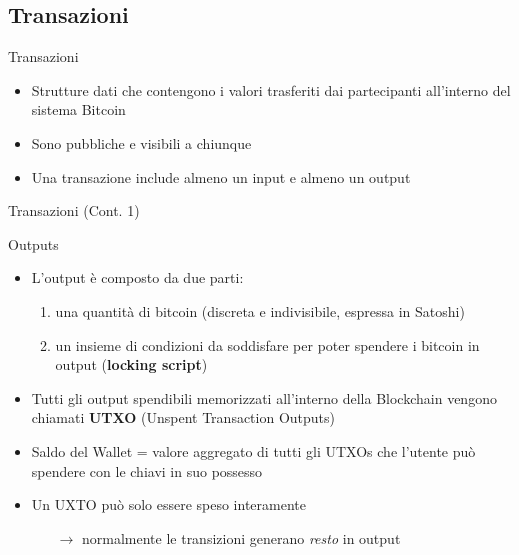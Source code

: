\documentclass{beamer}
\begin{document}
  \subsection{Transazioni}
  \begin{frame}{Transazioni}
    \begin{itemize}
      \item Strutture dati che contengono i valori trasferiti dai partecipanti all'interno del sistema Bitcoin
      \item Sono pubbliche e visibili a chiunque 
      \item Una transazione include almeno un input e almeno un output
    \end{itemize}
  \end{frame}





  \begin{frame}{Transazioni (Cont. 1)}
    \begin{block}{Outputs}
      \begin{itemize}
        \item L'output è composto da due parti:
        \begin{enumerate}
          \item una quantità di bitcoin (discreta e indivisibile, espressa in Satoshi) 
          \item un insieme di condizioni da soddisfare per poter spendere i bitcoin in output (\textbf{locking script})
        \end{enumerate}
        \pause
        \item Tutti gli output spendibili memorizzati all'interno della Blockchain vengono chiamati \textbf{UTXO} (Unspent Transaction Outputs)
        \item Saldo del Wallet = valore aggregato di tutti gli UTXOs che l'utente può spendere con le chiavi in suo possesso 
        \item Un UXTO può solo essere speso interamente
        \begin{itemize}
          \item[$\rightarrow$] normalmente le transizioni generano \emph{resto} in output
        \end{itemize}
      \end{itemize}
    \end{block}
  \end{frame}
\end{document}
